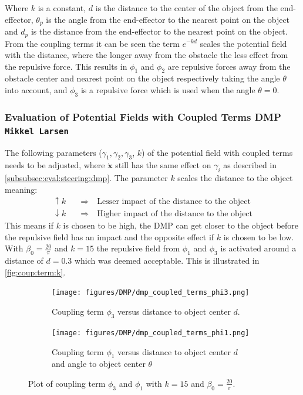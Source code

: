 \documentclass[../main.tex]{subfiles}
\begin{document}
Where $k$ is a constant, $d$ is the distance to the center of the object from the end-effector, $\theta_p$ is the angle from the end-effector to the nearest point on the object and $d_p$ is the distance from the end-effector to the nearest point on the object. From the coupling terms it can be seen the term $e^{-kd}$ scales the potential field with the distance, where the longer away from the obstacle the less effect from the repulsive force. This results in $\phi_1$ and $\phi_2$ are repulsive forces away from the obstacle center and nearest point on the object respectively taking the angle $\theta$ into account, and $\phi_3$ is a repulsive force which is used when the angle $\theta=0$.

\subsubsection{Evaluation of Potential Fields with Coupled Terms DMP \\  \normalfont\normalsize\texttt{Mikkel Larsen}} \label{subsubsec:eval:pot:coupled:term}

The following parameters ($\gamma_1, \gamma_2, \gamma_3$, $k$) of the potential field with coupled terms needs to be adjusted, where $\dot{\boldsymbol{x}}$ still has the same effect on $\gamma_i$ as described in \autoref{subsubsec:eval:steering:dmp}. The parameter $k$ scales the distance to the object meaning:
\begin{align}
    \uparrow k \quad &\Rightarrow \quad \text{Lesser impact of the distance to the object} \\
    \downarrow k \quad &\Rightarrow \quad \text{Higher impact of the distance to the object}
\end{align}
This means if $k$ is chosen to be high, the DMP can get closer to the object before the repulsive field has an impact and the opposite effect if $k$ is chosen to be low. With $\beta_0 = \frac{20}{\pi}$ and $k=15$ the repulsive field from $\phi_1$ and $\phi_3$ is activated around a distance of $d=0.3$ which was deemed acceptable. This is illustrated in \autoref{fig:coup:term:k}.   

\begin{figure}[H]
    \centering
    \begin{subfigure}[b]{0.48\textwidth}
        \centering
        \texttt{[image: figures/DMP/dmp\_coupled\_terms\_phi3.png]}
        \caption{Coupling term $\phi_3$ versus distance to object center $d$.}
    \end{subfigure}
    \hfill
    \begin{subfigure}[b]{0.48\textwidth}
        \centering
        \texttt{[image: figures/DMP/dmp\_coupled\_terms\_phi1.png]}
        \caption{Coupling term $\phi_1$ versus distance to object center $d$ and angle to object center $\theta$}
    \end{subfigure}
    \caption{Plot of coupling term $\phi_3$ and $\phi_1$ with $k=15$ and $\beta_0 = \frac{20}{\pi}$.}
    \label{fig:coup:term:k}
\end{figure}
\end{document}
